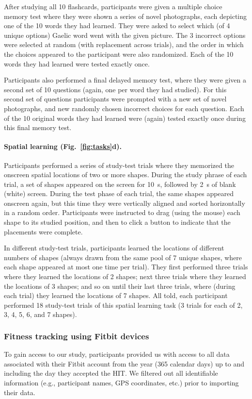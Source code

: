\documentclass[10pt]{article}
\begin{document}
After studying all 10 flashcards, participants were given a multiple
choice memory test where they were shown a series of novel
photographs, each depicting one of the 10 words they had learned.
They were asked to select which (of 4 unique options) Gaelic word went
with the given picture.  The 3 incorrect options were selected at
random (with replacement across trials), and the order in which the
choices appeared to the participant were also randomized.  Each of the
10 words they had learned were tested exactly once.

Participants also performed a final delayed memory test, where they
were given a second set of 10 questions (again, one per word they had
studied).  For this second set of questions participants were prompted
with a new set of novel photographs, and new randomly chosen incorrect
choices for each question.  Each of the 10 original words they had
learned were (again) tested exactly once during this final memory
test.



\paragraph*{Spatial learning (Fig.~\ref{fig:tasks}d).}
Participants performed a series of study-test trials where they
memorized the onscreen spatial locations of two or more shapes.
During the study phrase of each trial, a set of shapes appeared on the
screen for 10~s, followed by 2~s of blank (white) screen.  During the
test phase of each trial, the same shapes appeared onscreen again, but
this time they were vertically aligned and sorted horizontally in a
random order.  Participants were instructed to drag (using the mouse)
each shape to its studied position, and then to click a button to
indicate that the placements were complete.

In different study-test trials, participants learned the locations of
different numbers of shapes (always drawn from the same pool of 7
unique shapes, where each shape appeared at most one time per trial).
They first performed three trials where they learned the locations of
2 shapes; next three trials where they learned the locations of 3
shapes; and so on until their last three trials, where (during each
trial) they learned the locations of 7 shapes.  All told, each
participant performed 18 study-test trials of this spatial learning
task (3 trials for each of 2, 3, 4, 5, 6, and 7 shapes).


\subsubsection*{Fitness tracking using Fitbit devices}
To gain access to our study, participants provided us with access to
all data associated with their Fitbit account from the year (365
calendar days) up to and including the day they accepted the HIT.  We
filtered out all identifiable information (e.g., participant names,
GPS coordinates, etc.) prior to importing their data.
\end{document}
